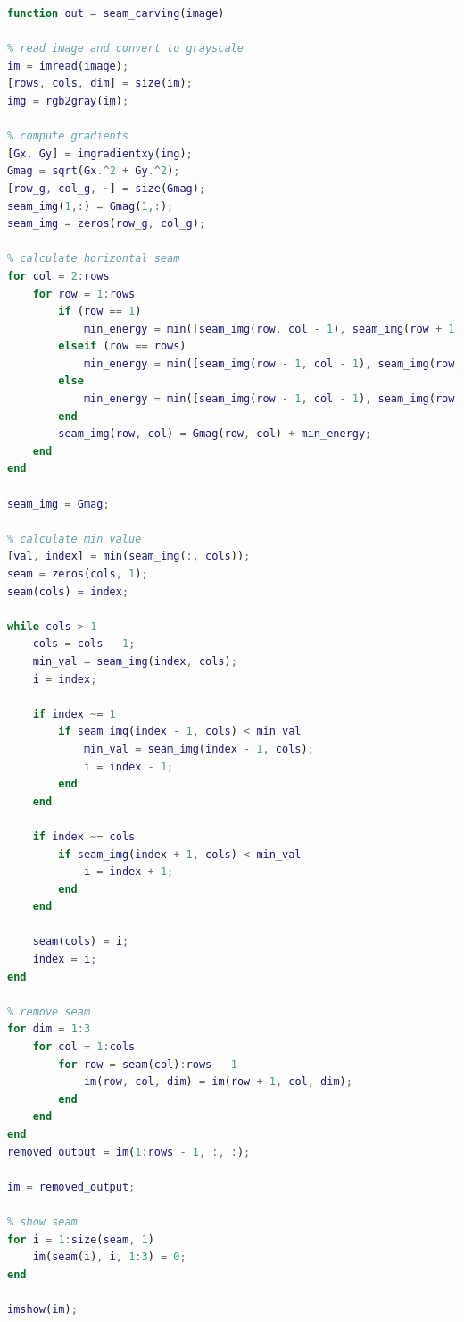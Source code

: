 \documentclass{csc_assignment4}
\begin{document}
\begin{description}
\newpage
\item[Q5.]
\begin{lstlisting}[language=MATLAB]
function out = seam_carving(image)

% read image and convert to grayscale
im = imread(image);
[rows, cols, dim] = size(im);
img = rgb2gray(im);

% compute gradients
[Gx, Gy] = imgradientxy(img);
Gmag = sqrt(Gx.^2 + Gy.^2);
[row_g, col_g, ~] = size(Gmag);
seam_img(1,:) = Gmag(1,:);
seam_img = zeros(row_g, col_g);

% calculate horizontal seam
for col = 2:rows
    for row = 1:rows
        if (row == 1)
            min_energy = min([seam_img(row, col - 1), seam_img(row + 1, col-1)]);
        elseif (row == rows)
            min_energy = min([seam_img(row - 1, col - 1), seam_img(row, col - 1)]);
        else
            min_energy = min([seam_img(row - 1, col - 1), seam_img(row,col - 1), seam_img(row + 1, col - 1)]);
        end
        seam_img(row, col) = Gmag(row, col) + min_energy;
    end
end

seam_img = Gmag;

% calculate min value 
[val, index] = min(seam_img(:, cols));
seam = zeros(cols, 1);
seam(cols) = index;

while cols > 1
    cols = cols - 1;
    min_val = seam_img(index, cols);
    i = index;
    
    if index ~= 1
        if seam_img(index - 1, cols) < min_val
            min_val = seam_img(index - 1, cols);
            i = index - 1;
        end
    end

    if index ~= cols
        if seam_img(index + 1, cols) < min_val
            i = index + 1;
        end 
    end
    
    seam(cols) = i;
    index = i;
end

% remove seam
for dim = 1:3
    for col = 1:cols
        for row = seam(col):rows - 1
            im(row, col, dim) = im(row + 1, col, dim);
        end
    end
end
removed_output = im(1:rows - 1, :, :);

im = removed_output;

% show seam
for i = 1:size(seam, 1)
    im(seam(i), i, 1:3) = 0;
end

imshow(im);


\end{lstlisting}
\end{description}
\end{document}
